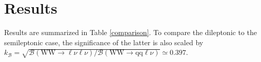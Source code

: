\documentclass[10pt,a4paper]{article}
\newcommand{\lnu}{$\ell\nu$}
\newcommand{\BR}{\mathcal{B}}
\newcommand{\etal}{\emph{et al.}}
\begin{document}
\section{Results}

Results are summarized in Table \ref{comparison}. To compare the dileptonic to the semileptonic case, the significance of the latter is also scaled by $k_{\BR}=\sqrt{\BR(\text{WW}\rightarrow\text{\lnu\lnu})/\BR(\text{WW}\rightarrow\text{qq\lnu})}\simeq 0.397$.

\end{document}
